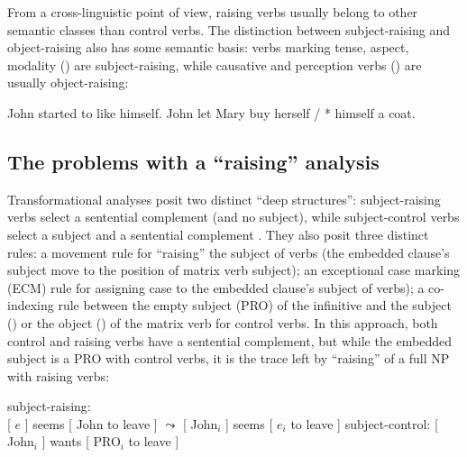 \documentclass[output=paper
                ,modfonts
                ,nonflat
	        ,collection
	        ,collectionchapter
	        ,collectiontoclongg
 	        ,biblatex
                ,babelshorthands
                ,newtxmath
                ,draftmode
                ,colorlinks, citecolor=brown
]{./langsci/langscibook}
\begin{document}
\eal
\judgewidth{\#}
\zl

	From a cross-linguistic point of view, raising verbs usually belong to other semantic classes than control verbs. The distinction between subject-raising and object-raising also has some semantic basis: verbs marking tense, aspect, modality () are subject-raising, while
causative and perception verbs () are usually object-raising:

	\begin{exe}
\ex  \begin{xlist}
\ex John started to like himself.
\ex John let Mary buy herself / * himself a coat.
	 \end{xlist}
	 \end{exe}
	
\subsection{The problems with a ``raising'' analysis}

Transformational analyses posit two distinct ``deep structures'': subject-raising verbs select a sentential complement (and no subject), while subject-control verbs select a subject and a sentential complement \citep{Postal1974, Chomsky1981}. They also
posit three distinct rules:  a movement rule for ``raising'' the subject of  verbs (the embedded clause's subject move to the position of matrix verb subject); an exceptional case marking (ECM) rule for assigning case to the embedded clause's subject of  verbs); a co-indexing rule between the empty subject (PRO) of the infinitive and the subject () or the object () of the matrix verb for control verbs.
In this approach, both control and raising verbs have a sentential complement, but while the embedded subject is a PRO with control verbs, it is the trace left by ``raising'' of a full NP with raising verbs:
	
\begin{exe}
\ex  \begin{xlist}
\ex 	subject-raising:\\
{}[ $e$ ] seems [ John to leave ] 
$\leadsto$  
{}[ John$_{i}$ ] seems [ $e_{i}$ to leave ]	
\ex subject-control:  
{}[ John$_{i}$ ] wants [ PRO$_{i}$ to leave ]	
 \end{xlist}
 \end{exe}
\end{document}
